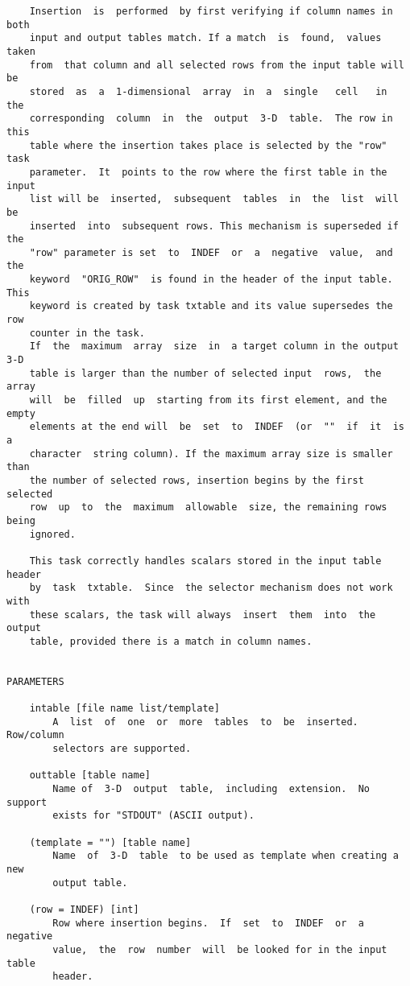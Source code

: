 \begin{verbatim}
    Insertion  is  performed  by first verifying if column names in both
    input and output tables match. If a match  is  found,  values  taken
    from  that column and all selected rows from the input table will be
    stored  as  a  1-dimensional  array  in  a  single   cell   in   the 
    corresponding  column  in  the  output  3-D  table.  The row in this
    table where the insertion takes place is selected by the "row"  task
    parameter.  It  points to the row where the first table in the input
    list will be  inserted,  subsequent  tables  in  the  list  will  be
    inserted  into  subsequent rows. This mechanism is superseded if the
    "row" parameter is set  to  INDEF  or  a  negative  value,  and  the
    keyword  "ORIG_ROW"  is found in the header of the input table. This
    keyword is created by task txtable and its value supersedes the  row
    counter in the task.
    If  the  maximum  array  size  in  a target column in the output 3-D
    table is larger than the number of selected input  rows,  the  array
    will  be  filled  up  starting from its first element, and the empty
    elements at the end will  be  set  to  INDEF  (or  ""  if  it  is  a
    character  string column). If the maximum array size is smaller than
    the number of selected rows, insertion begins by the first  selected
    row  up  to  the  maximum  allowable  size, the remaining rows being
    ignored.
    
    This task correctly handles scalars stored in the input table header
    by  task  txtable.  Since  the selector mechanism does not work with
    these scalars, the task will always  insert  them  into  the  output
    table, provided there is a match in column names.
    
    
PARAMETERS
    
    intable [file name list/template]
        A  list  of  one  or  more  tables  to  be  inserted. Row/column
        selectors are supported.
    
    outtable [table name]
        Name of  3-D  output  table,  including  extension.  No  support
        exists for "STDOUT" (ASCII output).
    
    (template = "") [table name]
        Name  of  3-D  table  to be used as template when creating a new
        output table.
    
    (row = INDEF) [int]
        Row where insertion begins.  If  set  to  INDEF  or  a  negative
        value,  the  row  number  will  be looked for in the input table
        header.
    

\end{verbatim}

